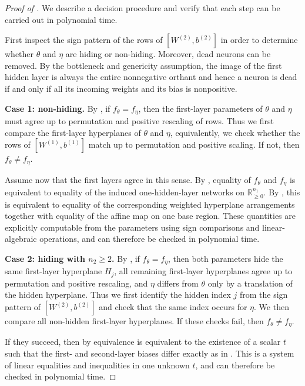 \documentclass{article}
\theoremstyle{definition}
\newcommand{\R}{\mathbb{R}}
\newcommand{\weights}[1]{W^{(#1)}}
\newcommand{\bias}[1]{b^{(#1)}}
\newcommand{\orthant}[1]{\R_{\geq 0}^{#1}}
\begin{document}
\begin{proof}[Proof of ]
We describe a decision procedure and verify that each step can be carried out in polynomial time.

First inspect the sign pattern of the rows of $[\weights{2},\bias{2}]$ in order to determine whether $\theta$ and $\eta$ are hiding or non-hiding. Moreover, dead neurons can be removed. By the bottleneck and genericity assumption, the image of the first hidden layer is always the entire nonnegative orthant and hence a neuron is dead if and only if all its incoming weights and its bias is nonpositive. 

\medskip
\noindent
\textbf{Case 1: non-hiding.}
By , if $f_\theta=f_\eta$, then the first-layer parameters of $\theta$ and $\eta$ must agree up to permutation and positive rescaling of rows. Thus we first compare the first-layer hyperplanes of $\theta$ and $\eta$, equivalently, we check whether the rows of $[\weights{1},\bias{1}]$ match up to permutation and positive scaling. If not, then $f_\theta\neq f_\eta$.

Assume now that the first layers agree in this sense. By , equality of $f_\theta$ and $f_\eta$ is equivalent to equality of the induced one-hidden-layer networks on $\orthant{n_1}$. By , this is equivalent to equality of the corresponding weighted hyperplane arrangements together with equality of the affine map on one base region. These quantities are explicitly computable from the parameters using sign comparisons and linear-algebraic operations, and can therefore be checked in polynomial time.

\medskip
\noindent
\textbf{Case 2: hiding with $n_2\ge 2$.}
By , if $f_\theta=f_\eta$, then both parameters hide the same first-layer hyperplane $H_j$, all remaining first-layer hyperplanes agree up to permutation and positive rescaling, and $\eta$ differs from $\theta$ only by a translation of the hidden hyperplane. Thus we first identify the hidden index $j$ from the sign pattern of $[\weights{2},\bias{2}]$ and check that the same index occurs for $\eta$. We then compare all non-hidden first-layer hyperplanes. If these checks fail, then $f_\theta\neq f_\eta$.

If they succeed, then by  equivalence is equivalent to the existence of a scalar $t$ such that the first- and second-layer biases differ exactly as in . This is a system of linear equalities and inequalities in one unknown $t$, and can therefore be checked in polynomial time.


\end{proof}
\end{document}
